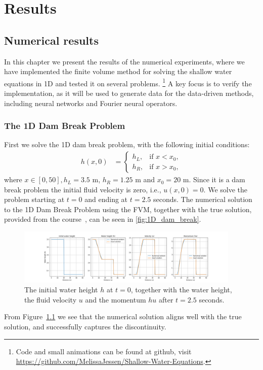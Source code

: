 \chapter{Results}


\section{Numerical results}
In this chapter we present the results of the numerical experiments, where we have implemented the finite volume method for solving the shallow water equations in 1D and tested it on several problems.
\footnote{Code and small animations can be found at github, visit \url{https://github.com/MelissaJessen/Shallow-Water-Equations}.}
A key focus is to verify the implementation, as it will be used to generate data for the data-driven methods, including neural networks and Fourier neural operators.

\subsection{The 1D Dam Break Problem}
First we solve the 1D dam break problem, with the following initial conditions:
\begin{align*}
    h(x,0) &= \begin{cases}
        h_L, & \text{if } x < x_0, \\
        h_R, & \text{if } x > x_0,
    \end{cases} 
\end{align*}
where $x \in [0, 50], h_L = 3.5$ m, $h_R = 1.25$ m and $x_0 = 20$ m.
Since it is a dam break problem the initial fluid velocity is zero, i.e., $u(x,0) = 0$.
We solve the problem starting at $t=0$ and ending at $t=2.5$ seconds.
The numerical solution to the 1D Dam Break Problem using the FVM, together with the true solution, provided from the course~\cite{phd_corse_2009}, can be seen in \autoref{fig:1D_dam_break}.
\begin{figure}[H]
    \centering
    \includegraphics[width=0.95\textwidth]{plots/sol_1D_val.png}
    \caption{The initial water height $h$ at $t=0$, together with the water height, the fluid velocity $u$ and the momentum $hu$ after $t=2.5$ seconds.}\label{fig:1D_dam_break}
\end{figure}
From Figure~\ref{fig:1D_dam_break} we see that the numerical solution aligns well with the true solution, and successfully captures the discontinuity.


